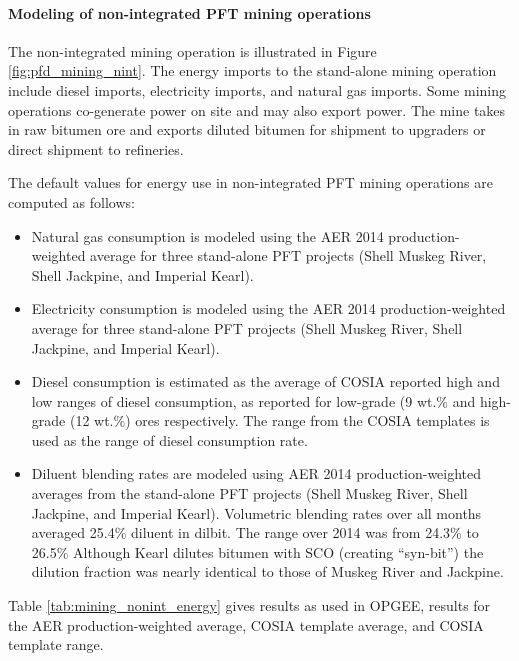 \documentclass[11pt]{report}
\begin{document}
\paragraph{Modeling of non-integrated PFT mining operations}

The non-integrated mining operation is illustrated in Figure \ref{fig:pfd_mining_nint}.  The energy imports to the stand-alone mining operation include diesel imports, electricity imports, and natural gas imports. Some mining operations co-generate power on site and may also export power. The mine takes in raw bitumen ore and exports diluted bitumen for shipment to upgraders or direct shipment to refineries.

The default values for energy use in non-integrated PFT mining operations are computed as follows:
\begin{itemize}
\item Natural gas consumption is modeled using the AER 2014 production-weighted average for three stand-alone PFT projects (Shell Muskeg River, Shell Jackpine, and Imperial Kearl).
\item Electricity consumption is modeled using the AER 2014 production-weighted average for three stand-alone PFT projects (Shell Muskeg River, Shell Jackpine, and Imperial Kearl).
\item Diesel consumption is estimated as the average of COSIA reported high and low ranges of diesel consumption, as reported for low-grade (9 wt.\% and high-grade (12 wt.\%) ores respectively. The range from the COSIA templates is used as the range of diesel consumption rate.
\item Diluent blending rates are modeled using AER 2014 production-weighted averages from the stand-alone PFT projects (Shell Muskeg River, Shell Jackpine, and Imperial Kearl). Volumetric blending rates over all months averaged 25.4\% diluent in dilbit. The range over 2014 was from 24.3\% to 26.5\% Although Kearl dilutes bitumen with SCO (creating ``syn-bit'') the dilution fraction was nearly identical to those of Muskeg River and Jackpine.
\end{itemize}

Table \ref{tab:mining_nonint_energy} gives results as used in OPGEE, results for the AER production-weighted average, COSIA template average, and COSIA template range.
\end{document}
